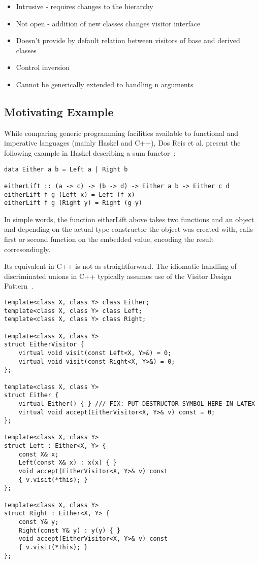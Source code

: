 \documentclass[submission,copyright]{eptcs}
\begin{document}
\begin{itemize}
\item Intrusive - requires changes to the hierarchy
\item Not open  - addition of new classes changes visitor interface
\item Doesn't provide by default relation between visitors of base and derived classes
\item Control inversion
\item Cannot be generically extended to handling n arguments
\end{itemize}

\subsection{Motivating Example}

While comparing generic programming facilities available to functional and 
imperative languages (mainly Haskel and C++), Dos Reis et al. present the 
following example in Haskel describing a sum functor~\cite{DRJ05}:

\begin{lstlisting}
data Either a b = Left a | Right b

eitherLift :: (a -> c) -> (b -> d) -> Either a b -> Either c d
eitherLift f g (Left x) = Left (f x)
eitherLift f g (Right y) = Right (g y)
\end{lstlisting}

In simple words, the function eitherLift above takes two functions and an 
object and depending on the actual type constructor the object was created with, 
calls first or second function on the embedded value, encoding the result 
corresondingly.

Its equivalent in C++ is not as straightforward. The idiomatic handling of 
discriminated unions in C++ typically assumes use of the Visitor Design 
Pattern~\cite{GHJV94}.

\begin{lstlisting}
template<class X, class Y> class Either;
template<class X, class Y> class Left;
template<class X, class Y> class Right;

template<class X, class Y>
struct EitherVisitor {
    virtual void visit(const Left<X, Y>&) = 0;
    virtual void visit(const Right<X, Y>&) = 0;
};

template<class X, class Y>
struct Either {
    virtual Either() { } /// FIX: PUT DESTRUCTOR SYMBOL HERE IN LATEX
    virtual void accept(EitherVisitor<X, Y>& v) const = 0;
};

template<class X, class Y>
struct Left : Either<X, Y> {
    const X& x;
    Left(const X& x) : x(x) { }
    void accept(EitherVisitor<X, Y>& v) const
    { v.visit(*this); }
};

template<class X, class Y>
struct Right : Either<X, Y> {
    const Y& y;
    Right(const Y& y) : y(y) { }
    void accept(EitherVisitor<X, Y>& v) const
    { v.visit(*this); }
};
\end{lstlisting}
\end{document}
